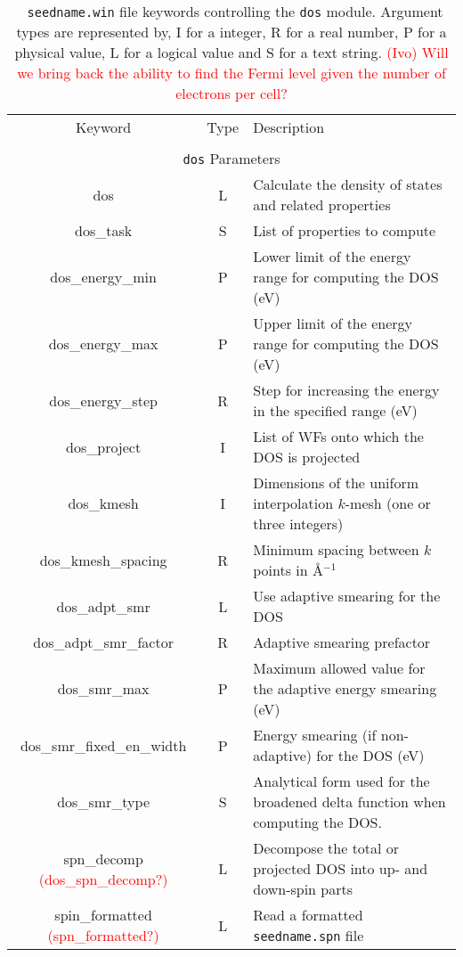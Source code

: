 \begin{table}[hH!]
\begin{center}
\begin{tabular}{|c|c|p{6cm}|}
  \hline
  Keyword & Type & Description \\
  &      &             \\
  \hline\hline
  \multicolumn{3}{|c|}{{\tt dos} Parameters} \\
  \hline
  {\sc dos}  & L & Calculate the density of states and related properties\\
  {\sc dos\_task}& S  & List of properties to compute \\
  {\sc dos\_energy\_min} & P & Lower limit of the energy range for
  computing the DOS (eV)\\
  {\sc dos\_energy\_max}& P & Upper limit of the energy range for
  computing the DOS (eV)\\
  {\sc dos\_energy\_step}& R & Step for increasing the energy in the specified range (eV)\\
  {\sc dos\_project}& I & List of WFs onto which the DOS is projected\\
  {\sc dos\_kmesh} & I & Dimensions of the uniform interpolation $k$-mesh (one or three integers)\\ 
  {\sc dos\_kmesh\_spacing}& R & Minimum spacing between $k$ points in \AA$^{-1}$\\
  {\sc dos\_adpt\_smr} & L & Use adaptive smearing for the DOS \\
  {\sc dos\_adpt\_smr\_factor} & R & Adaptive smearing prefactor\\
  {\sc dos\_smr\_max} & P & Maximum allowed value for the adaptive energy smearing (eV) \\
  {\sc dos\_smr\_fixed\_en\_width} & P  & Energy smearing (if non-adaptive) for the DOS (eV) \\   
  {\sc dos\_smr\_type} & S & Analytical form used for the broadened delta function
  when computing the DOS. \\
  {\sc spn\_decomp} \textcolor{red}{({\sc dos\_spn\_decomp}?)}& L & 
Decompose the total or projected DOS into up- and down-spin parts\\
  {\sc spin\_formatted} \textcolor{red}{({\sc spn\_formatted}?)}& L & 
  Read a formatted {\tt seedname.spn} file\\
  \hline
\end{tabular}
\caption[Parameter file keywords controlling the DOS module.]  {{\tt
    seedname.win} file keywords controlling the {\tt dos}
  module. Argument types are represented by, I for a integer, R for a
  real number, P for a physical value, L for a logical value and S for
  a text string.  \textcolor{red}{(Ivo) Will we bring back the ability
    to find the Fermi level given the number of electrons per cell?}
}
\label{parameter_keywords_dos}
\end{center}
\end{table}


